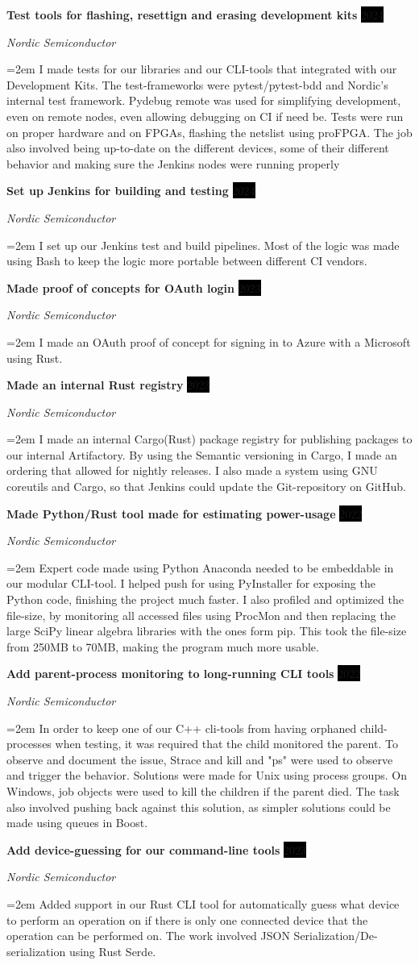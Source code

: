 \documentclass[paper=a4,fontsize=11pt,norsk]{scrartcl} %
\newcommand{\EducationEntry}[4]{
		\noindent \textbf{#1} \hfill      %
		\colorbox{Black}{%
			\parbox{6em}{%
			\hfill\color{White}#2}} \par  %
		\noindent \textit{#3} \par        %
		\noindent\hangindent=2em\hangafter=0 \small #4 %
		\normalsize \par}
\newcommand{\WorkEntry}[4]{				  %
		\noindent \textbf{#1} \hfill      %
		\colorbox{Black}{\color{White}#2} \par  %
		\noindent \textit{#3} \par              %
		\noindent\hangindent=2em\hangafter=0 \small #4 %
		\normalsize \par}
\begin{document}
\WorkEntry{Test tools for flashing, resettign and erasing development kits}{2024}{Nordic Semiconductor} { I made tests for our libraries and our CLI-tools that integrated with our Development Kits. The test-frameworks were pytest/pytest-bdd and Nordic's internal test framework. Pydebug remote was used for simplifying development, even on remote nodes, even allowing debugging on CI if need be. Tests were run on proper hardware and on FPGAs, flashing the netslist using proFPGA. The job also involved being up-to-date on the different devices, some of their different behavior and making sure the Jenkins nodes were running properly }
\WorkEntry{Set up Jenkins for building and testing}{2024}{Nordic Semiconductor} { I set up our Jenkins test and build pipelines. Most of the logic was made using Bash to keep the logic more portable between different CI vendors. }
\WorkEntry{Made proof of concepts for OAuth login}{2023}{Nordic Semiconductor} { I made an OAuth proof of concept for signing in to Azure with a Microsoft using Rust. }
\WorkEntry{Made an internal Rust registry}{2023}{Nordic Semiconductor} { I made an internal Cargo(Rust) package registry for publishing packages to our internal Artifactory. By using the Semantic versioning in Cargo, I made an ordering that allowed for nightly releases. I also made a system using GNU coreutils and Cargo, so that Jenkins could update the Git-repository on GitHub. }
\WorkEntry{Made Python/Rust tool made for estimating power-usage}{2022}{Nordic Semiconductor} { Expert code made using Python Anaconda needed to be embeddable in our modular CLI-tool. I helped push for using PyInstaller for exposing the Python code, finishing the project much faster. I also profiled and optimized the file-size, by monitoring all accessed files using ProcMon and then replacing the large SciPy linear algebra libraries with the ones form pip. This took the file-size from 250MB to 70MB, making the program much more usable. }
\WorkEntry{Add parent-process monitoring to long-running CLI tools}{2022}{Nordic Semiconductor} { In order to keep one of our C++ cli-tools from having orphaned child-processes when testing, it was required that the child monitored the parent. To observe and document the issue, Strace and kill and "ps" were used to observe and trigger the behavior. Solutions were made for Unix using process groups. On Windows, job objects were used to kill the children if the parent died. The task also involved pushing back against this solution, as simpler solutions could be made using queues in Boost. }
\WorkEntry{Add device-guessing for our command-line tools}{2023}{Nordic Semiconductor} { Added support in our Rust CLI tool for automatically guess what device to perform an operation on if there is only one connected device that the operation can be performed on. The work involved JSON Serialization/De-serialization using Rust Serde. }
\end{document}
